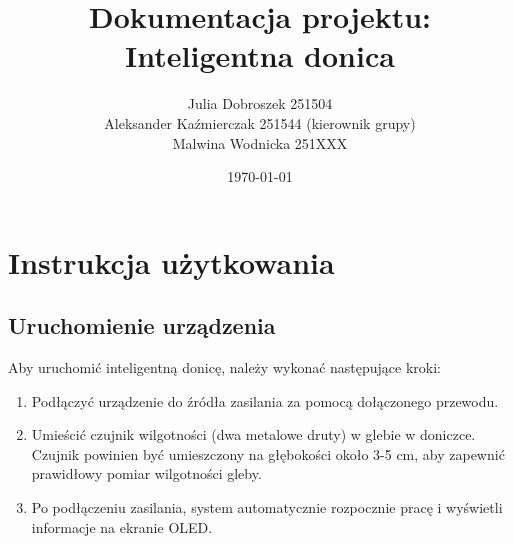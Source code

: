 \documentclass{article}
\title{Dokumentacja projektu: Inteligentna donica}
\author{
  Julia Dobroszek 251504 \\
  Aleksander Kaźmierczak 251544 (kierownik grupy)\\
  Malwina Wodnicka 251XXX \\  %
}
\date{\today}
\begin{document}
\maketitle


\section{Instrukcja użytkowania}

\subsection{Uruchomienie urządzenia}
Aby uruchomić inteligentną donicę, należy wykonać następujące kroki:
\begin{enumerate}
    \item Podłączyć urządzenie do źródła zasilania za pomocą dołączonego przewodu.
    \item Umieścić czujnik wilgotności (dwa metalowe druty) w glebie w doniczce. Czujnik powinien być umieszczony na głębokości około 3-5 cm, aby zapewnić prawidłowy pomiar wilgotności gleby.
    \item Po podłączeniu zasilania, system automatycznie rozpocznie pracę i wyświetli informacje na ekranie OLED.
    
\end{enumerate}
\end{document}
